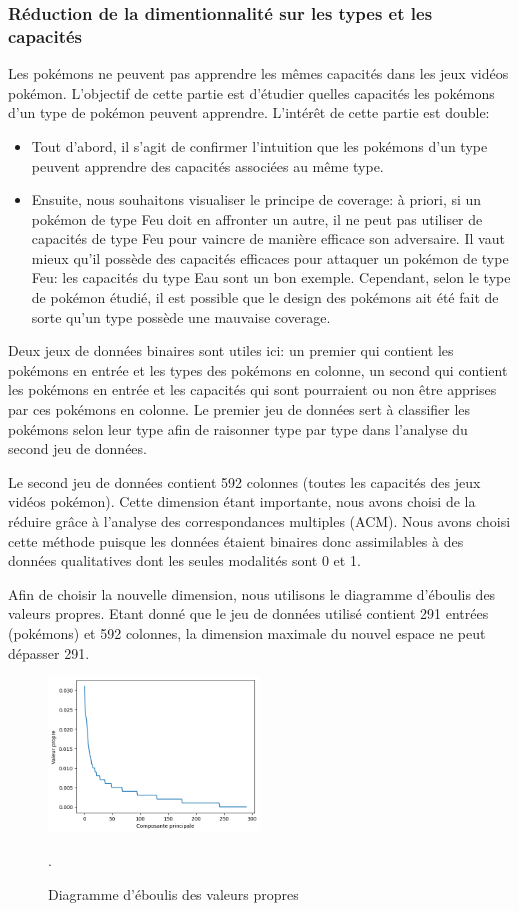 \documentclass[a4paper,12pt]{article}
\begin{document}
\subsubsection{Réduction de la dimentionnalité sur les types et les capacités}
Les pokémons ne peuvent pas apprendre les mêmes capacités dans les jeux vidéos
pokémon. L'objectif de cette partie est d'étudier quelles capacités les pokémons
d'un type de pokémon peuvent apprendre. L'intérêt de cette partie est double:  
\begin{itemize}
    \item 
    Tout d'abord, il s'agit de confirmer l'intuition que les pokémons d'un type
    peuvent apprendre des capacités associées au même type. 
    \item Ensuite, nous souhaitons visualiser le principe de coverage: à priori,
    si un pokémon de type Feu doit en affronter un autre, il ne peut pas
    utiliser de capacités de type Feu pour vaincre de manière efficace son
    adversaire. Il vaut mieux qu'il possède des capacités efficaces pour
    attaquer un pokémon de type Feu: les capacités du type Eau sont un bon
    exemple. Cependant, selon le type de pokémon étudié, il est possible que le
    design des pokémons ait été fait de sorte qu'un type possède une mauvaise
    coverage. 
\end{itemize}

Deux jeux de données binaires sont utiles ici: un premier qui contient les
pokémons en entrée et les types des pokémons en colonne, un second qui contient
les pokémons en entrée et les capacités qui sont pourraient ou non être apprises
par ces pokémons en colonne. Le premier jeu de données sert à classifier les
pokémons selon leur type afin de raisonner type par type dans l'analyse du
second jeu de données.

Le second jeu de données contient 592 colonnes (toutes les capacités des jeux
vidéos pokémon). Cette dimension étant importante, nous avons choisi de la
réduire grâce à l'analyse des correspondances multiples (ACM). Nous avons choisi
cette méthode puisque les données étaient binaires donc assimilables à des
données qualitatives dont les seules modalités sont 0 et 1. 

Afin de choisir la nouvelle dimension, nous utilisons le diagramme d'éboulis des
valeurs propres. Etant donné que le jeu de données utilisé contient 291 entrées
(pokémons) et 592 colonnes, la dimension maximale du nouvel espace ne peut
dépasser 291. 
\begin{figure}[!h]
    \centering
    \includegraphics[width=0.5\textwidth]{eboulis_MCA.png}
    \caption{Diagramme d'éboulis des valeurs propres}.
\end{figure}
\end{document}
